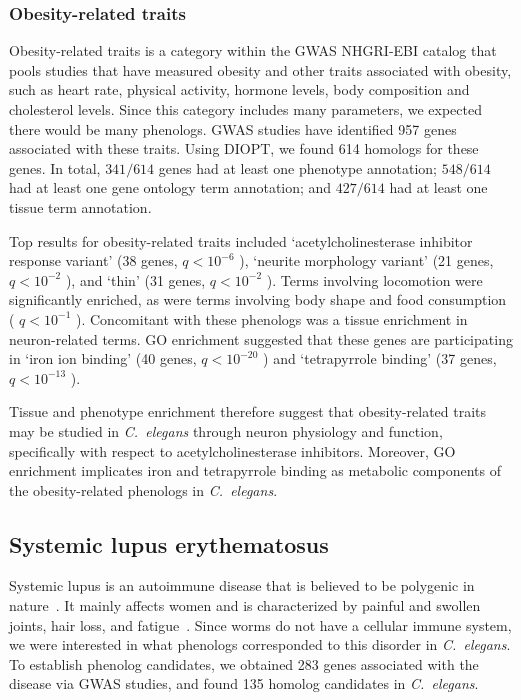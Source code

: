 \documentclass[10pt,letterpaper,twocolumn]{article}
\newcommand{\cel}{\emph{C.~elegans}}
\newcommand{\hobesity}{957}
\newcommand{\wobesity}{614}
\newcommand{\hlupus}{283}
\newcommand{\wlupus}{135}
\newcommand{\qval}[1]{
                      \ensuremath{
                                  q<10^{-#1}
                                  }
                      }
\begin{document}
\subsubsection*{Obesity-related traits}
Obesity-related traits is a category within the GWAS NHGRI-EBI catalog that
pools studies that have measured obesity and other traits associated with
obesity, such as heart rate, physical activity, hormone levels, body composition
and cholesterol levels. Since this category includes many parameters,
we expected there would be many phenologs. GWAS studies have identified
\hobesity{} genes associated with these traits. Using DIOPT, we found
\wobesity{} homologs for these genes. In total, $341/\wobesity{}$ genes had
at least one phenotype annotation; $548/\wobesity{}$ had at least one gene ontology term
annotation; and $427/\wobesity{}$ had at least one tissue term annotation.

Top results for obesity-related traits included `acetylcholinesterase inhibitor
response variant' (38 genes, \qval{6}),
`neurite morphology variant' (21 genes, \qval{2}),
and `thin' (31 genes, \qval{2}).
Terms involving locomotion were significantly enriched, as were terms involving
body shape and food consumption (\qval{1}). Concomitant with these phenologs was
a tissue enrichment in neuron-related terms. GO enrichment suggested that these
genes are participating in `iron ion binding' (40 genes, \qval{20}) and
`tetrapyrrole binding' (37 genes, \qval{13}).

Tissue and phenotype enrichment therefore suggest that obesity-related traits
may be studied in \cel{} through neuron physiology and function, specifically
with respect to acetylcholinesterase inhibitors. Moreover, GO enrichment
implicates iron and tetrapyrrole binding as metabolic components of
the obesity-related phenologs in \cel{}.

\subsection*{Systemic lupus erythematosus}
Systemic lupus is an autoimmune disease that is believed to be polygenic in
nature~\cite{Mohan2015}. It mainly affects women and is characterized by painful
and swollen joints, hair loss, and fatigue~\cite{Lisnevskaia2014}. Since worms do not have a
cellular immune system, we were interested in what phenologs corresponded to
this disorder in \cel{}. To establish phenolog candidates, we obtained
\hlupus{} genes associated with the disease via GWAS studies, and found
\wlupus{} homolog candidates in \cel{}.
\end{document}
